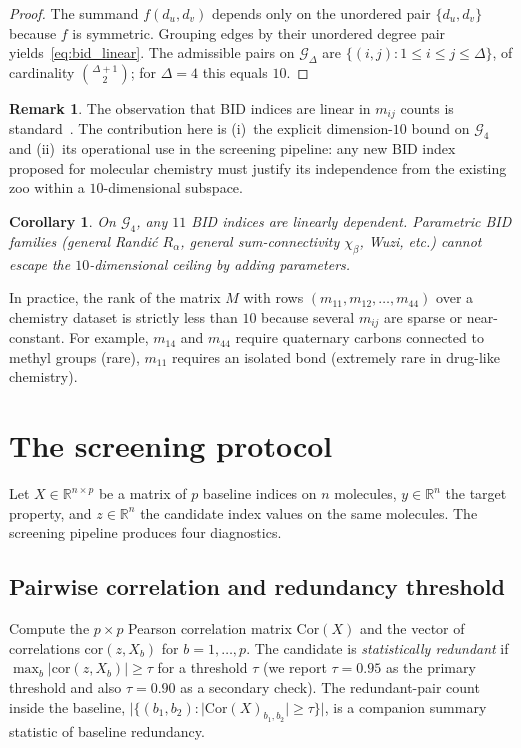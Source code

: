 \documentclass[11pt,a4paper]{article}
\newtheorem{corollary}[theorem]{Corollary}
\theoremstyle{definition}
\newtheorem{remark}[theorem]{Remark}
\begin{document}
\begin{proof}
The summand $f(d_u,d_v)$ depends only on the unordered pair
$\{d_u,d_v\}$ because $f$ is symmetric. Grouping edges by their
unordered degree pair yields~\eqref{eq:bid_linear}. The admissible
pairs on $\mathcal{G}_\Delta$ are
$\{(i,j):1\le i\le j\le\Delta\}$, of cardinality
$\binom{\Delta+1}{2}$; for $\Delta=4$ this equals $10$.
\end{proof}

\begin{remark}\label{rem:bid_credit}
The observation that BID indices are linear in $m_{ij}$ counts is
standard~\cite{GutmanBorovicanin2018BID}. The contribution here is
(i)~the explicit dimension-$10$ bound on $\mathcal{G}_4$ and
(ii)~its operational use in the screening pipeline: any new BID
index proposed for molecular chemistry must justify its
independence from the existing zoo within a $10$-dimensional
subspace.
\end{remark}

\begin{corollary}\label{cor:bid_redundancy}
On $\mathcal{G}_4$, any $11$ BID indices are linearly dependent.
Parametric BID families (general Randi\'c $R_\alpha$, general
sum-connectivity $\chi_\beta$, Wuzi, etc.) cannot escape the
$10$-dimensional ceiling by adding parameters.
\end{corollary}

In practice, the rank of the matrix $M$ with rows
$(m_{11}, m_{12}, \ldots, m_{44})$ over a chemistry dataset is
strictly less than $10$ because several $m_{ij}$ are sparse or
near-constant. For example, $m_{14}$ and $m_{44}$ require
quaternary carbons connected to methyl groups (rare),
$m_{11}$ requires an isolated bond (extremely rare in drug-like
chemistry).

\section{The screening protocol}\label{sec:protocol}

Let $X\in\mathbb{R}^{n\times p}$ be a matrix of $p$ baseline indices
on $n$ molecules, $y\in\mathbb{R}^n$ the target property, and
$z\in\mathbb{R}^n$ the candidate index values on the same molecules.
The screening pipeline produces four diagnostics.

\subsection{Pairwise correlation and redundancy threshold}
Compute the $p\times p$ Pearson correlation matrix $\mathrm{Cor}(X)$
and the vector of correlations $\mathrm{cor}(z,X_b)$ for
$b=1,\ldots,p$. The candidate is \emph{statistically redundant} if
$\max_b|\mathrm{cor}(z,X_b)|\ge\tau$ for a threshold $\tau$ (we
report $\tau=0.95$ as the primary threshold and also
$\tau=0.90$ as a secondary check). The redundant-pair count
inside the baseline,
$|\{(b_1,b_2):|\mathrm{Cor}(X)_{b_1,b_2}|\ge\tau\}|$, is a
companion summary statistic of baseline redundancy.
\end{document}
